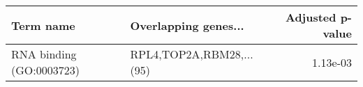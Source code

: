 \begin{tabular}{llr}
\toprule
               Term name &     Overlapping genes... &  Adjusted p-value \\
\midrule
RNA binding (GO:0003723) & RPL4,TOP2A,RBM28,...(95) &          1.13e-03 \\
\bottomrule
\end{tabular}
